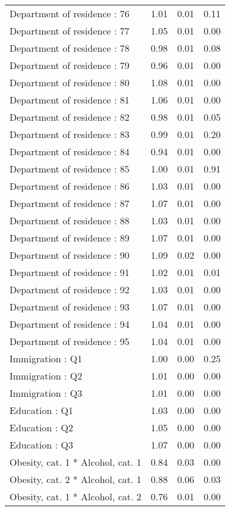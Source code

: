 \documentclass{article}
\begin{document}
\begin{longtable}{lrrr}
Department of residence : 76 & 1.01 & 0.01 & 0.11 \\ 
Department of residence : 77 & 1.05 & 0.01 & 0.00 \\ 
Department of residence : 78 & 0.98 & 0.01 & 0.08 \\ 
Department of residence : 79 & 0.96 & 0.01 & 0.00 \\ 
Department of residence : 80 & 1.08 & 0.01 & 0.00 \\ 
Department of residence : 81 & 1.06 & 0.01 & 0.00 \\ 
Department of residence : 82 & 0.98 & 0.01 & 0.05 \\ 
Department of residence : 83 & 0.99 & 0.01 & 0.20 \\ 
Department of residence : 84 & 0.94 & 0.01 & 0.00 \\ 
Department of residence : 85 & 1.00 & 0.01 & 0.91 \\ 
Department of residence : 86 & 1.03 & 0.01 & 0.00 \\ 
Department of residence : 87 & 1.07 & 0.01 & 0.00 \\ 
Department of residence : 88 & 1.03 & 0.01 & 0.00 \\ 
Department of residence : 89 & 1.07 & 0.01 & 0.00 \\ 
Department of residence : 90 & 1.09 & 0.02 & 0.00 \\ 
Department of residence : 91 & 1.02 & 0.01 & 0.01 \\ 
Department of residence : 92 & 1.03 & 0.01 & 0.00 \\ 
Department of residence : 93 & 1.07 & 0.01 & 0.00 \\ 
Department of residence : 94 & 1.04 & 0.01 & 0.00 \\ 
Department of residence : 95 & 1.04 & 0.01 & 0.00 \\ 
Immigration : Q1 & 1.00 & 0.00 & 0.25 \\ 
Immigration : Q2 & 1.01 & 0.00 & 0.00 \\ 
Immigration : Q3 & 1.01 & 0.00 & 0.00 \\ 
Education : Q1 & 1.03 & 0.00 & 0.00 \\ 
Education : Q2 & 1.05 & 0.00 & 0.00 \\ 
Education : Q3 & 1.07 & 0.00 & 0.00 \\ 
Obesity, cat. 1 * Alcohol, cat. 1 & 0.84 & 0.03 & 0.00 \\ 
Obesity, cat. 2 * Alcohol, cat. 1 & 0.88 & 0.06 & 0.03 \\ 
Obesity, cat. 1 * Alcohol, cat. 2 & 0.76 & 0.01 & 0.00 \\ 

\end{longtable}
\end{document}
